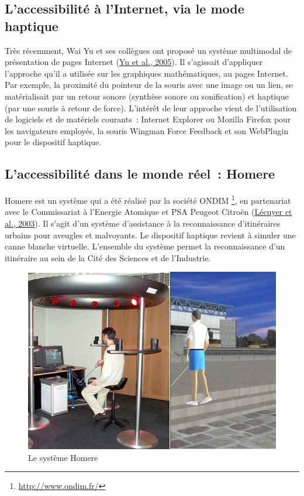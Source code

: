 \documentclass[
]{book}
\begin{document}
\hypertarget{laccessibilituxe9-uxe0-linternet-via-le-mode-haptique}{%
\subsection{L'accessibilité à l'Internet, via le mode haptique}\label{laccessibilituxe9-uxe0-linternet-via-le-mode-haptique}}

Très récemment, Wai Yu et ses collègues ont proposé un système multimodal
de présentation de pages Internet (\protect\hyperlink{ref-yu2005improving}{Yu et al., 2005}). Il s'agissait d'appliquer
l'approche qu'il a utilisée
sur les graphiques mathématiques, au pages Internet. Par exemple, la
proximité du pointeur de la souris avec une image ou un lien, se
matérialisait par un retour sonore (synthèse sonore ou sonification) et
haptique (par une souris à retour de force). L'intérêt de leur approche vient
de l'utilisation de logiciels et de matériels courants~: Internet Explorer ou
Mozilla Firefox pour les navigateurs employés, la souris Wingman Force
Feedback et son WebPlugin pour le dispositif haptique.

\hypertarget{laccessibilituxe9-dans-le-monde-ruxe9el-homere}{%
\subsection{L'accessibilité dans le monde réel~: Homere}\label{laccessibilituxe9-dans-le-monde-ruxe9el-homere}}

Homere est un système qui a été réalisé par la société
ONDIM \footnote{\url{http://www.ondim.fr/}}, en partenariat avec le Commissariat à
l'Energie Atomique et PSA Peugeot Citroën (\protect\hyperlink{ref-lecuyer2003homere}{Lécuyer et al., 2003}). Il s'agit
d'un système d'assistance à la reconnaissance d'itinéraires urbains pour
aveugles et malvoyants. Le dispositif haptique revient à simuler une canne
blanche virtuelle. L'ensemble du système permet la reconnaissance d'un
itinéraire au sein de la Cité des Sciences et de l'Industrie.

\begin{figure}
\centering
\includegraphics{img/homere.jpg}
\caption{\label{fig:homere}Le système Homere}
\end{figure}
\end{document}
